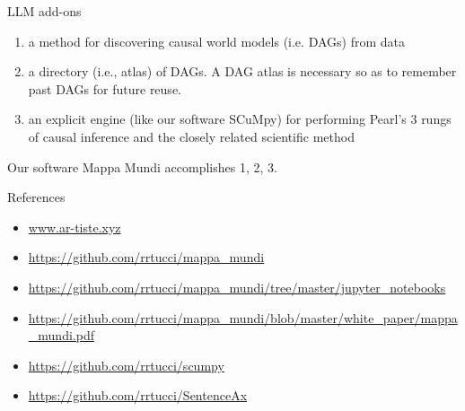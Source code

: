 \documentclass{beamer}
\begin{document}
\begin{frame}{LLM add-ons}
\begin{enumerate}
\item a method for discovering causal world models (i.e. DAGs) from data
\item a directory (i.e., atlas) of DAGs. A DAG atlas is necessary so as to remember past DAGs for future reuse.
\item an explicit engine (like our software SCuMpy) for performing Pearl's 3 rungs of causal inference and the closely related scientific method
\end{enumerate}

Our software Mappa Mundi accomplishes 1, 2, 3.


\end{frame}\begin{frame}{References}

\begin{itemize}
    \item \url{www.ar-tiste.xyz}
    \item \url{https://github.com/rrtucci/mappa_mundi}
    \item \url{https://github.com/rrtucci/mappa_mundi/tree/master/jupyter_notebooks}
    \item \url{https://github.com/rrtucci/mappa_mundi/blob/master/white_paper/mappa_mundi.pdf}
    \item \url{https://github.com/rrtucci/scumpy}
    \item \url{https://github.com/rrtucci/SentenceAx}
\end{itemize}
\end{frame}
\end{document}

